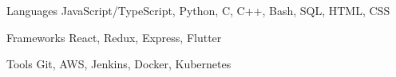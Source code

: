 

\begin{cvskills}

  \cvskill
    {Languages} %
    {JavaScript/TypeScript, Python, C, C++, Bash, SQL, HTML, CSS} %

  \cvskill
    {Frameworks} %
    {React, Redux, Express, Flutter} %

  \cvskill
    {Tools} %
    {Git, AWS, Jenkins, Docker, Kubernetes} %

\end{cvskills}
